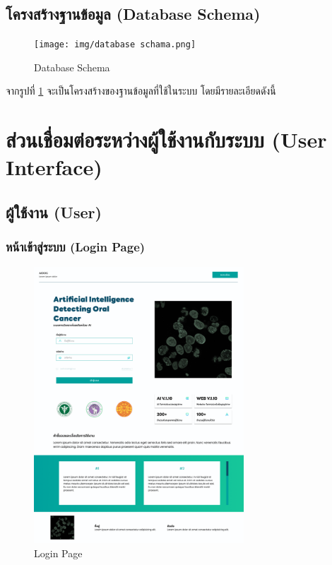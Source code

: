 \subsection{โครงสร้างฐานข้อมูล (Database Schema)}
\begin{figure}[h]
    \begin{center}
        \texttt{[image: img/database schama.png]}
    \end{center}
    \caption[Poem]{Database Schema}
    \label{fig:data_schema}
\end{figure}
จากรูปที่ \ref{fig:data_schema} จะเป็นโครงสร้างของฐานข้อมูลที่ใช้ในระบบ โดยมีรายละเอียดดังนี้


\section{ส่วนเชื่อมต่อระหว่างผู้ใช้งานกับระบบ (User Interface)}
\subsection{ผู้ใช้งาน (User)}
\subsubsection{หน้าเข้าสู่ระบบ (Login Page)}
\begin{figure}[h]
    \begin{center}
        \includegraphics[width=0.7\textwidth]{img/user/1-login-page.png}
    \end{center}
    \caption[Poem]{Login Page}
    \label{fig:login}
\end{figure}

